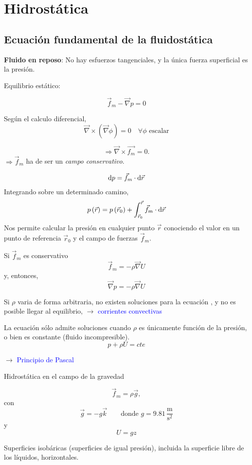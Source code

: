 \chapter{Hidrostática}

\section{Ecuación fundamental de la fluidostática}

\textbf{Fluido en reposo}: No hay esfuerzos tangenciales, y la única
fuerza superficial es la presión.

Equilibrio estático: 

\begin{equation}
\vec{f}_{m}-\vec{\nabla}p=0
\end{equation}


Según el calculo diferencial, 
\[
\vec{\nabla}\times\left(\vec{\nabla}\phi\right)=0\quad\forall\phi\text{ escalar}
\]

\[
\Rightarrow\vec{\nabla}\times\vec{f_{m}}=0.
\]
 $\Rightarrow\vec{f}_{m}$ ha de ser un \emph{campo conservativo}.

\[
\text{d} p=\vec{f}_{m}\cdot\text{d}\vec{r}
\]
 Integrando sobre un determinado camino, 
\[
p\left(\vec{r}\right)=p\left(\vec{r}_{0}\right)+\int_{\vec{r}_{0}}^{\vec{r}}\vec{f}_{m}\cdot\text{d}\vec{r}
\]
 Nos permite calcular la presión en cualquier punto $\vec{r}$ conociendo
el valor en un punto de referencia $\vec{r}_{0}$ y el campo de fuerzas
$\vec{f}_{m}$.

Si $\vec{f}_{m}$ es conservativo 
\[
\vec{f}_{m}=-\rho\vec{\nabla}U
\]
 y, entonces, 
\[
\vec{\nabla}p=-\rho\vec{\nabla}U
\]

Si $\rho$ varia de forma arbitraria, no existen soluciones para la
ecuación , y no es posible llegar al equilibrio, $\rightarrow$ \textcolor{blue}{corrientes
convectivas}

La ecuación sólo admite soluciones cuando $\rho$ es únicamente función
de la presión, o bien es constante (fluido incompresible). 
\[
p+\rho U=cte
\]

$\rightarrow$ \textcolor{blue}{Principio de Pascal}

Hidrostática en el campo de la gravedad

\[
\vec{f}_{m}=\rho\vec{g},
\]
 con 
\[
\vec{g}=-g\vec{k}\qquad\text{donde }g=9.81\,\frac{\textrm{m}}{\textrm{s}^{2}}
\]
 y 
\[
U=gz
\]



Superficies isobáricas (superficies de igual presión), incluida la
superficie libre de los líquidos, horizontales. %

